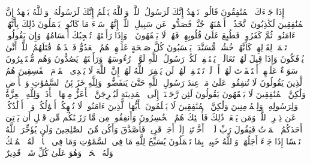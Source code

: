 \stopbuffer
\startbuffer[\q:63:1]
إِذَا جَاۤءَكَ ٱلۡمُنَٰفِقُونَ قَالُوا۟ نَشۡهَدُ إِنَّكَ لَرَسُولُ ٱللَّهِۗ وَٱللَّهُ یَعۡلَمُ إِنَّكَ لَرَسُولُهُۥ وَٱللَّهُ یَشۡهَدُ إِنَّ ٱلۡمُنَٰفِقِینَ لَكَٰذِبُونَ%
\stopbuffer
\startbuffer[\q:63:2]
ٱتَّخَذُوۤا۟ أَیۡمَٰنَهُمۡ جُنَّةࣰ فَصَدُّوا۟ عَن سَبِیلِ ٱللَّهِۚ إِنَّهُمۡ سَاۤءَ مَا كَانُوا۟ یَعۡمَلُونَ%
\stopbuffer
\startbuffer[\q:63:3]
ذَٰلِكَ بِأَنَّهُمۡ ءَامَنُوا۟ ثُمَّ كَفَرُوا۟ فَطُبِعَ عَلَىٰ قُلُوبِهِمۡ فَهُمۡ لَا یَفۡقَهُونَ%
\stopbuffer
\startbuffer[\q:63:4]
۞ وَإِذَا رَأَیۡتَهُمۡ تُعۡجِبُكَ أَجۡسَامُهُمۡۖ وَإِن یَقُولُوا۟ تَسۡمَعۡ لِقَوۡلِهِمۡۖ كَأَنَّهُمۡ خُشُبࣱ مُّسَنَّدَةࣱۖ یَحۡسَبُونَ كُلَّ صَیۡحَةٍ عَلَیۡهِمۡۚ هُمُ ٱلۡعَدُوُّ فَٱحۡذَرۡهُمۡۚ قَٰتَلَهُمُ ٱللَّهُۖ أَنَّىٰ یُؤۡفَكُونَ%
\stopbuffer
\startbuffer[\q:63:5]
وَإِذَا قِیلَ لَهُمۡ تَعَالَوۡا۟ یَسۡتَغۡفِرۡ لَكُمۡ رَسُولُ ٱللَّهِ لَوَّوۡا۟ رُءُوسَهُمۡ وَرَأَیۡتَهُمۡ یَصُدُّونَ وَهُم مُّسۡتَكۡبِرُونَ%
\stopbuffer
\startbuffer[\q:63:6]
سَوَاۤءٌ عَلَیۡهِمۡ أَسۡتَغۡفَرۡتَ لَهُمۡ أَمۡ لَمۡ تَسۡتَغۡفِرۡ لَهُمۡ لَن یَغۡفِرَ ٱللَّهُ لَهُمۡۚ إِنَّ ٱللَّهَ لَا یَهۡدِی ٱلۡقَوۡمَ ٱلۡفَٰسِقِینَ%
\stopbuffer
\startbuffer[\q:63:7]
هُمُ ٱلَّذِینَ یَقُولُونَ لَا تُنفِقُوا۟ عَلَىٰ مَنۡ عِندَ رَسُولِ ٱللَّهِ حَتَّىٰ یَنفَضُّوا۟ۗ وَلِلَّهِ خَزَاۤئِنُ ٱلسَّمَٰوَٰتِ وَٱلۡأَرۡضِ وَلَٰكِنَّ ٱلۡمُنَٰفِقِینَ لَا یَفۡقَهُونَ%
\stopbuffer
\startbuffer[\q:63:8]
یَقُولُونَ لَئِن رَّجَعۡنَاۤ إِلَى ٱلۡمَدِینَةِ لَیُخۡرِجَنَّ ٱلۡأَعَزُّ مِنۡهَا ٱلۡأَذَلَّۚ وَلِلَّهِ ٱلۡعِزَّةُ وَلِرَسُولِهِۦ وَلِلۡمُؤۡمِنِینَ وَلَٰكِنَّ ٱلۡمُنَٰفِقِینَ لَا یَعۡلَمُونَ%
\stopbuffer
\startbuffer[\q:63:9]
یَٰۤأَیُّهَا ٱلَّذِینَ ءَامَنُوا۟ لَا تُلۡهِكُمۡ أَمۡوَٰلُكُمۡ وَلَاۤ أَوۡلَٰدُكُمۡ عَن ذِكۡرِ ٱللَّهِۚ وَمَن یَفۡعَلۡ ذَٰلِكَ فَأُو۟لَٰۤئِكَ هُمُ ٱلۡخَٰسِرُونَ%
\stopbuffer
\startbuffer[\q:63:10]
وَأَنفِقُوا۟ مِن مَّا رَزَقۡنَٰكُم مِّن قَبۡلِ أَن یَأۡتِیَ أَحَدَكُمُ ٱلۡمَوۡتُ فَیَقُولَ رَبِّ لَوۡلَاۤ أَخَّرۡتَنِیۤ إِلَىٰۤ أَجَلࣲ قَرِیبࣲ فَأَصَّدَّقَ وَأَكُن مِّنَ ٱلصَّٰلِحِینَ%
\stopbuffer
\startbuffer[\q:63:11]
وَلَن یُؤَخِّرَ ٱللَّهُ نَفۡسًا إِذَا جَاۤءَ أَجَلُهَاۚ وَٱللَّهُ خَبِیرُۢ بِمَا تَعۡمَلُونَ%
\stopbuffer
\startbuffer[\q:64:1]
یُسَبِّحُ لِلَّهِ مَا فِی ٱلسَّمَٰوَٰتِ وَمَا فِی ٱلۡأَرۡضِۖ لَهُ ٱلۡمُلۡكُ وَلَهُ ٱلۡحَمۡدُۖ وَهُوَ عَلَىٰ كُلِّ شَیۡءࣲ قَدِیرٌ%
\stopbuffer
